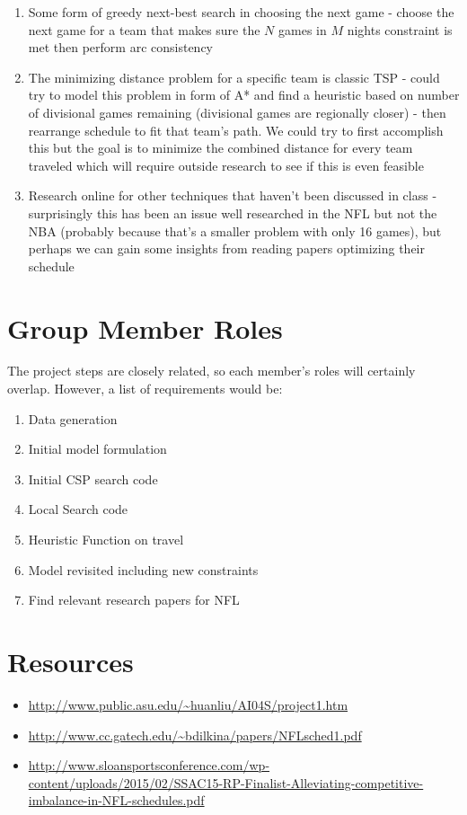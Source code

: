 \documentclass{article}
\begin{document}
	\begin{enumerate}
		\item Some form of greedy next-best search in choosing the next game - choose the next game for a team that makes sure the $N$ games in $M$ nights constraint is met then perform arc consistency
		\item The minimizing distance problem for a specific team is classic TSP - could try to model this problem in form of A* and find a heuristic based on number of divisional games remaining (divisional games are regionally closer) - then rearrange schedule to fit that team's path. We could try to first accomplish this but the goal is to minimize the combined distance for every team traveled which will require outside research to see if this is even feasible
		\item Research online for other techniques that haven't been discussed in class - surprisingly this has been an issue well researched in the NFL but not the NBA (probably because that's a smaller problem with only 16 games), but perhaps we can gain some insights from reading papers optimizing their schedule
	\end{enumerate}

	\section{Group Member Roles}
	The project steps are closely related, so each member's roles will certainly overlap. However, a list of requirements would be:

	\begin{enumerate}
		\item Data generation
		\item Initial model formulation
		\item Initial CSP search code
		\item Local Search code
		\item Heuristic Function on travel
		\item Model revisited including new constraints
		\item Find relevant research papers for NFL
	\end{enumerate}

	\section{Resources}
	\begin{itemize}
		\item \url{http://www.public.asu.edu/~huanliu/AI04S/project1.htm}
		\item \url{http://www.cc.gatech.edu/~bdilkina/papers/NFLsched1.pdf}
		\item \url{http://www.sloansportsconference.com/wp-content/uploads/2015/02/SSAC15-RP-Finalist-Alleviating-competitive-imbalance-in-NFL-schedules.pdf}
	\end{itemize}
	
\end{document}
